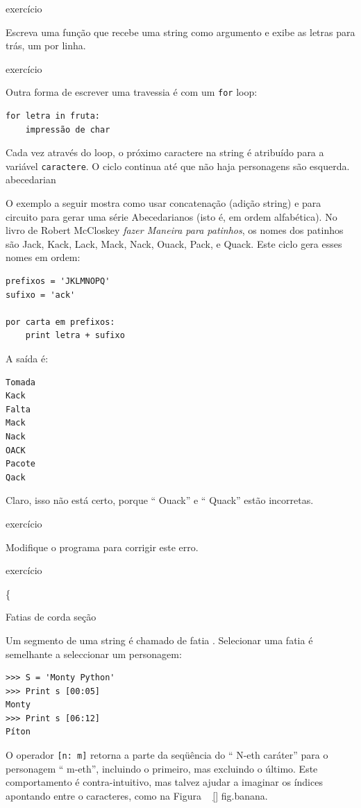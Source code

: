 \documentclass[10pt]{book}
\begin{document}
{\begin{} exercício

Escreva uma função que recebe uma string como argumento
e exibe as letras para trás, um por linha.

\end{} exercício

Outra forma de escrever uma travessia é com um {\tt for} loop:

\begin{verbatim}
for letra in fruta:
    impressão de char
\end{verbatim}
%
Cada vez através do loop, o próximo caractere na string é atribuído
para a variável {\tt caractere}. O ciclo continua até que não haja personagens são
esquerda.
\index{} abecedarian

O exemplo a seguir mostra como usar concatenação (adição string)
e {\tt} para circuito para gerar uma série Abecedarianos (isto é, em
ordem alfabética). No livro de Robert McCloskey {\em fazer
Maneira para patinhos}, os nomes dos patinhos são Jack, Kack, Lack,
Mack, Nack, Ouack, Pack, e Quack. Este ciclo gera esses nomes em
ordem:

\begin{verbatim}
prefixos = 'JKLMNOPQ'
sufixo = 'ack'

por carta em prefixos:
    print letra + sufixo
\end{verbatim}
%
A saída é:

\begin{verbatim}
Tomada
Kack
Falta
Mack
Nack
OACK
Pacote
Qack
\end{verbatim}
%
Claro, isso não está certo, porque `` Ouack'' e
`` Quack'' estão incorretas.

\begin{} exercício

Modifique o programa para corrigir este erro.

\end{} exercício



\{} Fatias de corda seção
\label{fatia}

Um segmento de uma string é chamado de fatia {\bf}. Selecionar uma fatia é
semelhante a seleccionar um personagem:

\begin{verbatim}
>>> S = 'Monty Python'
>>> Print s [00:05]
Monty
>>> Print s [06:12]
Píton
\end{verbatim}
%
O operador {\tt [n: m]} retorna a parte da seqüência do 
`` N-eth caráter'' para o personagem `` m-eth'', incluindo o primeiro, mas
excluindo o último. Este comportamento é contra-intuitivo, mas talvez
ajudar a imaginar os índices apontando {\em} entre o
caracteres, como na Figura ~ \ref {} fig.banana.
\end{document}
